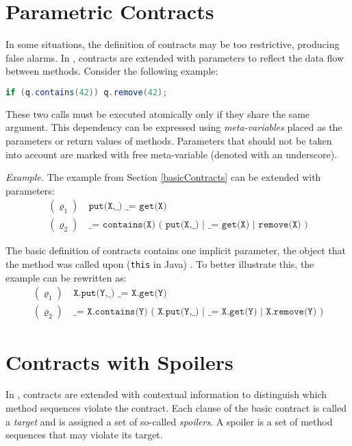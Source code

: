 \section{Parametric Contracts}
\label{parametricContracts}

In some situations, the definition of contracts may be too restrictive,
producing false alarms. In \cite{contracts}, contracts are extended with
parameters to reflect the data flow between methods. Consider the following
example:
\begin{lstlisting}[language=java]
if (q.contains(42)) q.remove(42);
\end{lstlisting}

These two calls must be executed atomically only if they share the same
argument. This dependency can be expressed using \emph{meta-variables} placed as
the parameters or return values of methods. Parameters that should not be taken
into account are marked with free meta-variable (denoted with an underscore).

\emph{Example.} The example from Section \ref{basicContracts} can be extended
with parameters:
\begin{align*}
    (\varrho_1) &\ \texttt{put(X,\_) \_ = get(X)}\\
    (\varrho_2) &\ \texttt{\_ = contains(X) ( put(X,\_) | \_ = get(X) |
    remove(X) )}
\end{align*}

The basic definition of contracts contains one implicit parameter, the object
that the method was called upon (\texttt{this} in Java) \cite{FITPUB10817}. To
better illustrate this, the example can be rewritten as:
\begin{align*}
    (\varrho_1) &\ \texttt{X.put(Y,\_) \_ = X.get(Y)}\\
    (\varrho_2) &\ \texttt{\_ = X.contains(Y) ( X.put(Y,\_) | \_ = X.get(Y) |
    X.remove(Y) )}
\end{align*}


\section{Contracts with Spoilers}
\label{contractsWithSpoilers}

In \cite{contracts}, contracts are extended with contextual information to
distinguish which method sequences violate the contract. Each clause of the
basic contract is called a \emph{target} and is assigned a set of so-called
\emph{spoilers}. A spoiler is a set of method sequences that may violate its
target.

